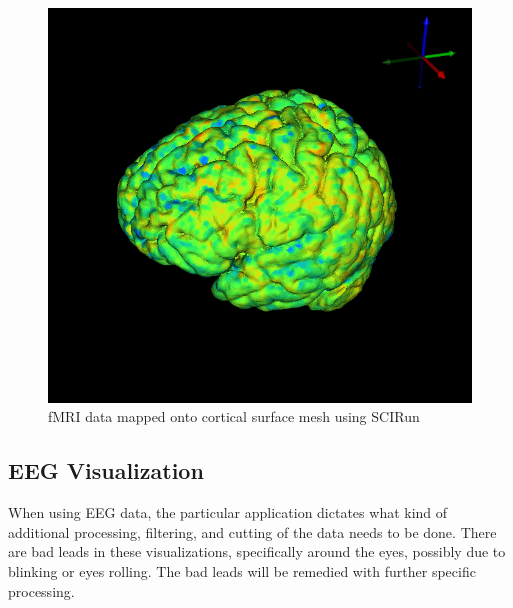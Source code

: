 \begin{figure}[H]
\begin{center}
\includegraphics[width=.75\textwidth]{Figures/fmri_1}
\caption{fMRI data mapped onto cortical surface mesh using SCIRun}
\label{fig:fmrivis}
\end{center}
\end{figure}

\subsection{EEG Visualization}

When using EEG data, the particular application dictates what kind of additional processing, filtering, and cutting of the data needs to be done. There are bad leads in these visualizations, specifically around the eyes, possibly due to blinking or eyes rolling. The bad leads will be remedied with further specific processing.

